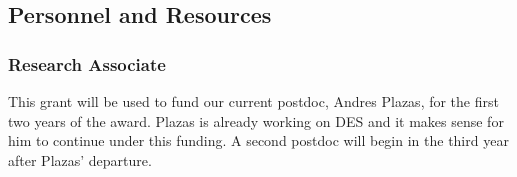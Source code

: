 \documentclass[12pt]{article}
\begin{document}

\subsection{Personnel and Resources} \label{sec:resources}

\subsubsection{Research Associate}

This grant will be used to fund our current postdoc, Andres Plazas, for the
first two years of the award. Plazas is already working on DES and it makes
sense for him to continue under this funding.  A second postdoc will begin in
the third year after Plazas' departure.  
\end{document}
